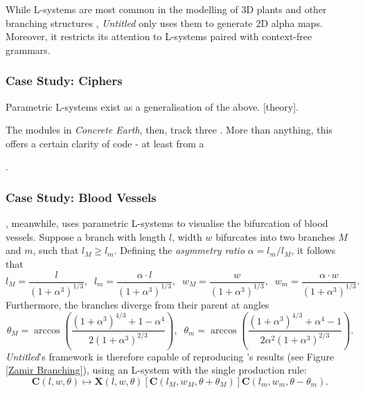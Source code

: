 \documentclass[a4paper, 11pt]{article}
\begin{document}
\begin{flushleft}
\vspace{5pt}\noindent
While L-systems are most common in the modelling of 3D plants and other branching structures \citep{prusinkiewiczAlgorithmicBeauty}, \textit{Untitled} only uses them to generate 2D alpha maps. Moreover, it restricts its attention to L-systems paired with context-free grammars.

\subsubsection{Case Study: Ciphers}

Parametric L-systems \citep{hananParametricLSystems} exist as a generalisation of the above. [theory].

\vspace{5pt}\noindent
The modules in \textit{Concrete Earth}, then, track three . More than anything, this offers a certain clarity of code - at least from a 

\vspace{5pt}.

\subsubsection{Case Study: Blood Vessels} %

\citet{zamirArterialBranchingLSystems}, meanwhile, uses parametric L-systems to visualise the bifurcation of blood vessels. Suppose a branch with length $l$, width $w$ bifurcates into two branches $M$ and $m$, such that $l_M \geq l_m$. Defining the \textit{asymmetry ratio} $\alpha = l_m/l_M$, it follows that
$$l_M = \frac{l}{\left(1+\alpha^3\right)^{1/3}}, \;\; l_m = \frac{\alpha\cdot l}{\left(1+\alpha^3\right)^{1/3}}, \;\; w_M = \frac{w}{\left(1+\alpha^3\right)^{1/3}}, \;\; w_m = \frac{\alpha\cdot w}{\left(1+\alpha^3\right)^{1/3}}.$$
Furthermore, the branches diverge from their parent at angles
$$\theta_M = \arccos\left(\frac{\left(1+\alpha^3\right)^{4/3}+1-\alpha^4}{2\left(1+\alpha^3\right)^{2/3}}\right), \;\; \theta_m = \arccos\left(\frac{\left(1+\alpha^3\right)^{4/3}+\alpha^4-1}{2\alpha^2\left(1+\alpha^3\right)^{2/3}}\right).$$
\textit{Untitled}'s framework is therefore capable of reproducing \citeauthor{zamirArterialBranchingLSystems}'s results (see Figure \ref{Zamir Branching}), using an L-system with the single production rule:  
$$\mathbf{C}(l,w,\theta) \mapsto \mathbf{X}(l,w,\theta)[\mathbf{C}(l_M,w_M,\theta+\theta_M)]\mathbf{C}(l_m,w_m,\theta-\theta_m).$$


\end{flushleft}
\end{document}

